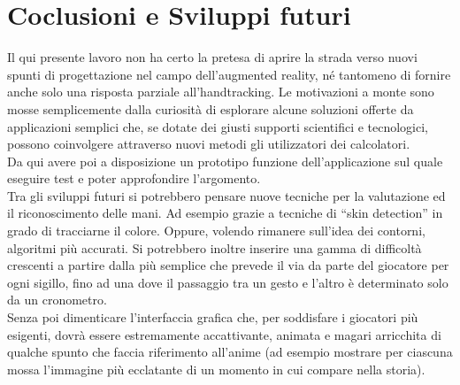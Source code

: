 \documentclass[a4paper,10pt, twocolumn]{article}
\begin{document}
\section{Coclusioni e Sviluppi futuri}
  Il qui presente lavoro non ha certo la pretesa di aprire la strada verso nuovi 
  spunti di progettazione nel campo dell'augmented reality,
  n\'{e} tantomeno di fornire anche solo una
  risposta parziale all'handtracking.
  Le motivazioni a monte sono mosse semplicemente dalla curiosit\`{a} di
  esplorare alcune soluzioni offerte da
  applicazioni semplici che, se dotate dei giusti supporti
  scientifici e tecnologici, possono coinvolgere attraverso nuovi metodi
  gli utilizzatori dei calcolatori.\\
  Da qui avere poi a disposizione un prototipo funzione dell'applicazione
  sul quale eseguire test e poter approfondire l'argomento.\\
  
  Tra gli sviluppi futuri si potrebbero pensare nuove 
  tecniche per la valutazione ed il riconoscimento delle mani.
  Ad esempio grazie a tecniche di ``skin detection'' in grado di
  tracciarne il colore. Oppure, volendo rimanere sull'idea dei 
  contorni, algoritmi pi\`{u} accurati. 
  Si potrebbero inoltre inserire una gamma di difficolt\`{a} crescenti
  a partire dalla pi\`{u} semplice che prevede il via da parte del giocatore
  per ogni sigillo,
  fino ad una dove il passaggio tra un gesto e l'altro \`{e} determinato 
  solo da un cronometro.\\
  Senza poi dimenticare l'interfaccia grafica che,
  per soddisfare i giocatori pi\`{u} esigenti,
  dovr\`{a} essere 
  estremamente accattivante, animata e magari arricchita di qualche
  spunto che faccia riferimento all'anime 
  (ad esempio mostrare per ciascuna mossa l'immagine 
  pi\`{u} ecclatante di un momento in cui compare nella storia).  

\clearpage



\nocite{*}



\end{document}
